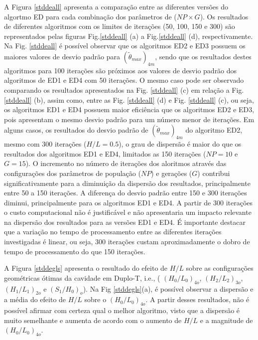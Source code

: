 \documentclass[12pt,A4,A4pt]{article}
\begin{document}
A Figura \ref{stddeall} apresenta a comparação entre as diferentes versões do algortmo ED para cada combinação dos parâmetros de  ($NP \times G$). Os resultados de diferentes algoritmos com os limites de iterações (50, 100, 150 e 300) são representados pelas figuras Fig.\ref{stddeall} (a) a Fig.\ref{stddeall} (d), respectivamente. Na Fig. \ref{stddeall} é possível observar que os algoritmos ED2 e ED3 possuem os maiores valores de desvio padrão para $({\tilde{\theta}}_{max})_{4m}$, sendo que os resultados destes algoritmos para 100 iterações são próximos aos valores de desvio padrão dos algoritmos de ED1 e ED4 com 50 iterações. O mesmo caso pode ser observado comparando os resultados apresentados na Fig. \ref{stddeall} (c) em relação a Fig. \ref{stddeall} (b), assim como, entre as Fig. \ref{stddeall} (d) e Fig. \ref{stddeall} (c), ou seja, os algoritmos ED1 e ED4 possuem maior eficiência que os algoritmos ED2 e ED3, pois apresentam o mesmo desvio padrão para um número menor de iterações. Em alguns casos, os resultados do desvio padrão de $({\tilde{\theta}}_{max})_{4m}$ do algoritmo ED2, mesmo com 300 iterações ($H/L=0.5$), o grau de dispersão é maior do que os resultados dos algoritmos ED1 e ED4, limitados as 150 iterações ($NP=10$ e $G=15$). O incremento no número de iterações dos aloritmos através das configurações dos parâmetros de população ($NP$) e gerações ($G$) contribui significativamente para a diminuição da dispersão dos resultados, principalmente entre 50 a 150 iterações. A diferença do desvio padrão entre 150 e 300 iterações diminui, principalmente para os algoritmos ED1 e ED4. A partir de 300 iterações o custo computacional não é justificável e não apresentaria um impacto relevante na dispersão dos resultados para as versões ED1 e ED4. É importante destacar que a variação no tempo de processamento entre as diferentes iterações investigadas é linear, ou seja, 300 iterações custam aproximadamente o dobro de tempo de processamento do que 150 iterações.


\hspace{0.5cm} A Figura \ref{stddegls} apresenta o resultado do efeito de $H/L$ sobre as configurações geométricas ótimas da cavidade em Duplo-T, i.e., ( ${(H_{0}/L_{0})_{4o}}$,  ${(H_{2}/L_{2})_{3o}}$, ${(H_{1}/L_{1})_{2o}}$ e ${(S_{1}/H_{0})_{o}}$). Na Fig \ref{stddegls}(a), é possível observar a dispersão e a média do efeito de  $H/L$ sobre o ${(H_{0}/L_{0})_{4o}}$. A partir desses resultados, não é possível afirmar com certeza qual o melhor algoritmo, visto que a dispersão é muito semelhante e aumenta de acordo com o aumento de $H/L$ e a magnitude de ${(H_{0}/L_{0})_{4o}}$.
\end{document}
